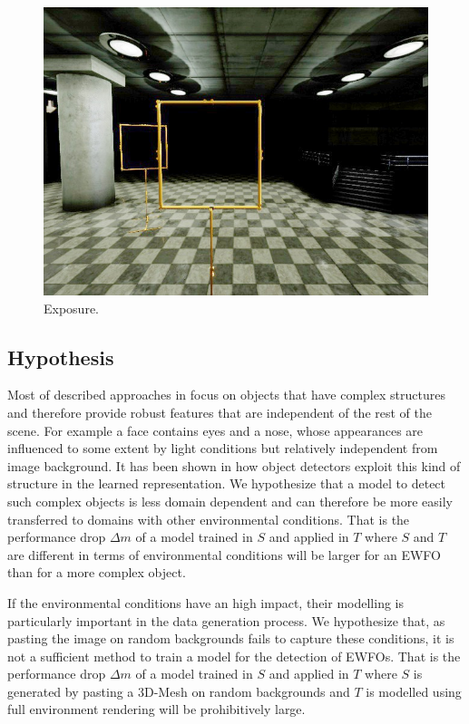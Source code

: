 \begin{figure}[htbp]
\begin{minipage}{0.33\textwidth}
		\includegraphics[width=\textwidth]{fig/gate_example_exposure}
	\caption{Exposure.}
\label{fig:exposure}
	\end{minipage}
\end{figure}

\subsection{Hypothesis}
\label{sec:training:hypothesis}

Most of described approaches in  focus on objects that have complex structures and therefore provide robust features that are independent of the rest of the scene. For example a face contains eyes and a nose, whose appearances are influenced to some extent by light conditions but relatively independent from image background. It has been shown in  how object detectors exploit this kind of structure in the learned representation. We hypothesize that a model to detect such complex objects is less domain dependent and can therefore be more easily transferred to domains with other environmental conditions. That is the performance drop $\Delta m$ of a model trained in $S$ and applied in $T$ where $S$ and $T$ are different in terms of environmental conditions will be larger for an \ac{EWFO} than for a more complex object.

If the environmental conditions have an high impact, their modelling is particularly important in the data generation process. We hypothesize that, as pasting the image on random backgrounds fails to capture these conditions, it is not a sufficient method to train a model for the detection of \acp{EWFO}. That is the performance drop $\Delta m$ of a model trained in $S$ and applied in $T$ where $S$ is generated by pasting a 3D-Mesh on random backgrounds and $T$ is modelled using full environment rendering will be prohibitively large.
 
